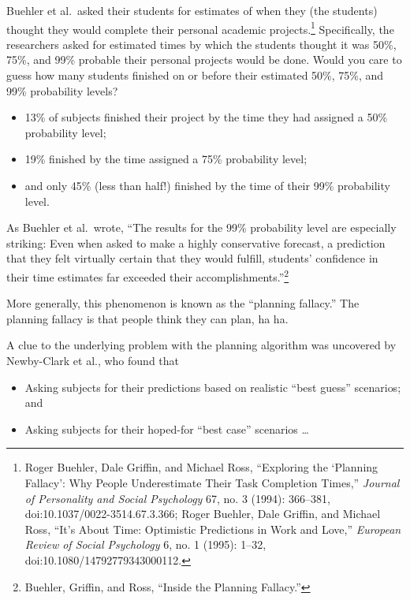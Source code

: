 {
 Buehler et al.~asked their students for estimates of when they
(the students) thought they would complete their personal academic
projects.\footnote{Roger Buehler, Dale Griffin, and Michael Ross,
``Exploring the `Planning
Fallacy': Why People Underestimate Their Task
Completion Times,'' \textit{Journal of Personality
and Social Psychology} 67, no. 3 (1994): 366--381,
doi:10.1037/0022-3514.67.3.366; Roger Buehler, Dale Griffin, and
Michael Ross, ``It's About Time:
Optimistic Predictions in Work and Love,''
\textit{European Review of Social Psychology} 6, no. 1 (1995): 1--32,
doi:10.1080/14792779343000112.} Specifically, the researchers asked for
estimated times by which the students thought it was 50\%, 75\%, and
99\% probable their personal projects would be done. Would you care to
guess how many students finished on or before their estimated 50\%,
75\%, and 99\% probability levels?}

\begin{itemize}
\item {
 13\% of subjects finished their project by the time they had
assigned a 50\% probability level;}

\item {
 19\% finished by the time assigned a 75\% probability level;}

\item {
 and only 45\% (less than half!) finished by the time of their 99\%
 probability level.}
\end{itemize}

{
 As Buehler et al.~wrote, ``The results for the
99\% probability level are especially striking: Even when asked to make
a highly conservative forecast, a prediction that they felt virtually
certain that they would fulfill, students' confidence
in their time estimates far exceeded their
accomplishments.''\footnote{Buehler, Griffin, and Ross, ``Inside the
Planning Fallacy.''}}

{
 More generally, this phenomenon is known as the
``planning fallacy.'' The planning
fallacy is that people think they can plan, ha ha.}

{
 A clue to the underlying problem with the planning algorithm was
uncovered by Newby-Clark et al., who found that}

\begin{itemize}
\item {
 Asking subjects for their predictions based on realistic
``best guess'' scenarios; and}

\item {
 Asking subjects for their hoped-for ``best
 case'' scenarios \ldots}
\end{itemize}

